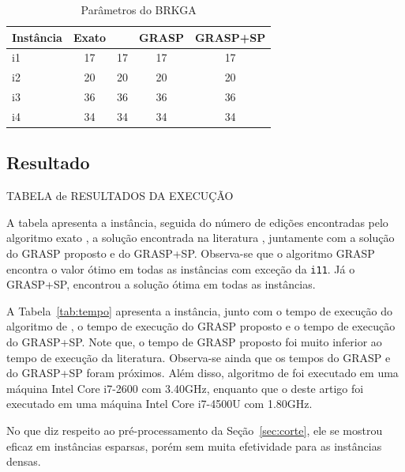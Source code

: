 \documentclass[article]{rian_article}
\begin{document}
\begin{table}[htb]
	\caption{Parâmetros do BRKGA}
	\label{tab:params}
	\centering
	\footnotesize
	\begin{tabular}{|l|c|c|c|c|}
		\hline
		Instância	&Exato    &\citep{chan1997}    & GRASP	& GRASP+SP	\\ \hline
		i1	        &17       &17	  & 17		&17		\\ \hline
		i2	        &20       &20	  & 20		&20		\\ \hline
		i3	        &36       &36	  & 36		&36		\\ \hline
		i4	        &34       &34	  & 34		&34		\\ \hline
	\end{tabular}
\end{table}


\subsection{Resultado}

TABELA de RESULTADOS DA EXECUÇÃO

A tabela apresenta a instância, seguida do número de edições encontradas pelo algoritmo exato \citet{martello2002}, a solução encontrada na literatura \citep{chan1997}, juntamente com a solução do GRASP proposto e do GRASP+SP.
Observa-se que o algoritmo GRASP encontra o valor ótimo em todas as instâncias com exceção da \texttt{i11}.
Já o GRASP+SP, encontrou a solução ótima em todas as instâncias.


A Tabela~\ref{tab:tempo} apresenta a instância, junto com o tempo de execução do algoritmo de \citet{martello2002}, o tempo de execução do GRASP proposto e o tempo de execução do GRASP+SP.
Note que, o tempo de GRASP proposto foi muito inferior ao tempo de execução da literatura.
Observa-se ainda que os tempos do GRASP e do GRASP+SP foram próximos.
Além disso, algoritmo de foi executado em uma máquina Intel Core i7-2600 com 3.40GHz, enquanto que o deste artigo foi executado em uma máquina Intel Core i7-4500U com 1.80GHz.


No que diz respeito ao pré-processamento da Seção~\ref{sec:corte}, ele se mostrou eficaz em instâncias esparsas, porém sem muita efetividade para as instâncias densas.
\end{document}
